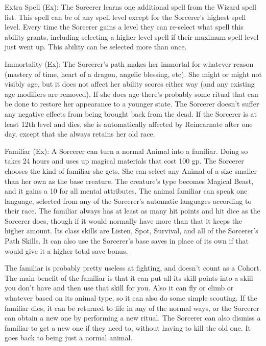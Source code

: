 \begin{description*}
\item[Extra Spell (Ex):] The Sorcerer learns one additional spell from the Wizard spell list. This spell can be of any spell level except for the Sorcerer's highest spell level. Every time the Sorcerer gains a level they can re-select what spell this ability grants, including selecting a higher level spell if their maximum spell level just went up. This ability can be selected more than once.

\item[Immortality (Ex):] The Sorcerer's path makes her immortal for whatever reason (mastery of time, heart of a dragon, angelic blessing, etc). She might or might not visibly age, but it does not affect her ability scores either way (and any existing age modifiers are removed). If she does age there's probably some ritual that can be done to restore her appearance to a younger state. The Sorcerer doesn't suffer any negative effects from being brought back from the dead. If the Sorcerer is at least 12th level and dies, she is automatically affected by Reincarnate after one day, except that she always retains her old race.

\item[Familiar (Ex):] A Sorcerer can turn a normal Animal into a familiar. Doing so takes 24 hours and uses up magical materials that cost 100 gp. The Sorcerer chooses the kind of familiar she gets. She can select any Animal of a size smaller than her own as the base creature. The creature's type becomes Magical Beast, and it gains a 10 for all mental attributes. The animal familiar can speak one language, selected from any of the Sorcerer's automatic languages according to their race. The familiar always has at least as many hit points and hit dice as the Sorcerer does, though if it would normally have more than that it keeps the higher amount. Its class skills are Listen, Spot, Survival, and all of the Sorcerer's Path Skills. It can also use the Sorcerer's base saves in place of its own if that would give it a higher total save bonus.

The familiar is probably pretty useless at fighting, and doesn't count as a Cohort. The main benefit of the familiar is that it can put all its skill points into a skill you don't have and then use that skill for you. Also it can fly or climb or whatever based on its animal type, so it can also do some simple scouting. If the familiar dies, it can be returned to life in any of the normal ways, or the Sorcerer can obtain a new one by performing a new ritual. The Sorcerer can also dismiss a familiar to get a new one if they need to, without having to kill the old one. It goes back to being just a normal animal.


\end{description*}
